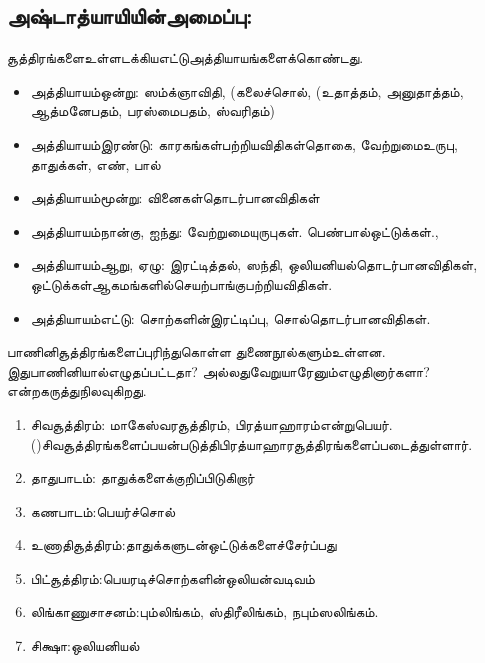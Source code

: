\subsection{அஷ்டாத்யாயியின்அமைப்பு:}

 சூத்திரங்களைஉள்ளடக்கியஎட்டுஅத்தியாயங்களைக்கொண்டது.

\begin{itemize}
\item அத்தியாயம்ஒன்று: ஸம்க்ஞாவிதி, (கலைச்சொல், (உதாத்தம், அனுதாத்தம், ஆத்மனேபதம், பரஸ்மைபதம், ஸ்வரிதம்)

 \item அத்தியாயம்இரண்டு: காரகங்கள்பற்றியவிதிகள்தொகை, வேற்றுமைஉருபு, தாதுக்கள், எண், பால்

 \item அத்தியாயம்மூன்று: வினைகள்தொடர்பானவிதிகள்

 \item அத்தியாயம்நான்கு, ஐந்து: வேற்றுமையுருபுகள். பெண்பால்ஒட்டுக்கள்.,

 \item அத்தியாயம்ஆறு, ஏழு: இரட்டித்தல், ஸந்தி, ஒலியனியல்தொடர்பானவிதிகள், ஒட்டுக்கள்ஆகமங்களில்செயற்பாங்குபற்றியவிதிகள்.

 \item அத்தியாயம்எட்டு: சொற்களின்இரட்டிப்பு, சொல்தொடர்பானவிதிகள்.

\end{itemize}

பாணினிசூத்திரங்களைப்புரிந்துகொள்ள  துணைநூல்களும்உள்ளன. இதுபாணினியால்எழுதப்பட்டதா? அல்லதுவேறுயாரேனும்எழுதினார்களா? என்றகருத்துநிலவுகிறது.

\begin{enumerate}
\item சிவசூத்திரம்:  மாகேஸ்வரசூத்திரம், பிரத்யாஹாரம்என்றுபெயர். ()சிவசூத்திரங்களைப்பயன்படுத்திபிரத்யாஹாரசூத்திரங்களைப்படைத்துள்ளார்.

 \item தாதுபாடம்:  தாதுக்களைக்குறிப்பிடுகிறார்

 \item கணபாடம்:பெயர்ச்சொல்

 \item உணாதிசூத்திரம்:தாதுக்களுடன்ஒட்டுக்களைச்சேர்ப்பது

 \item பிட்சூத்திரம்:பெயரடிச்சொற்களின்ஒலியன்வடிவம்

 \item லிங்காணுசாசனம்:பும்லிங்கம், ஸ்திரீலிங்கம், நபும்ஸலிங்கம்.

 \item சிக்ஷா:ஒலியனியல்

\end{enumerate}

